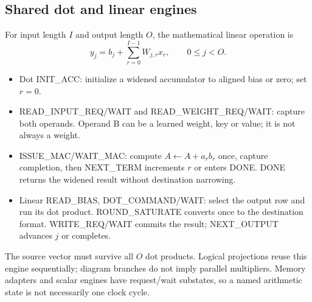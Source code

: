 \documentclass[11pt,a4paper]{article}
\begin{document}
\subsection{Shared dot and linear engines}
For input length $I$ and output length $O$, the mathematical linear operation is
\[
y_j=b_j+\sum_{r=0}^{I-1}W_{j,r}x_r,\qquad 0\leq j<O.
\]
\begin{itemize}
\item Dot INIT\_ACC: initialize a widened accumulator to aligned bias or zero; set $r=0$.
\item READ\_INPUT\_REQ/WAIT and READ\_WEIGHT\_REQ/WAIT: capture both operands. Operand B can be a learned weight, key or value; it is not always a weight.
\item ISSUE\_MAC/WAIT\_MAC: compute $A\leftarrow A+a_rb_r$ once, capture completion, then NEXT\_TERM increments $r$ or enters DONE. DONE returns the widened result without destination narrowing.
\item Linear READ\_BIAS, DOT\_COMMAND/WAIT: select the output row and run its dot product. ROUND\_SATURATE converts once to the destination format. WRITE\_REQ/WAIT commits the result; NEXT\_OUTPUT advances $j$ or completes.
\end{itemize}
The source vector must survive all $O$ dot products. Logical projections reuse this engine sequentially; diagram branches do not imply parallel multipliers. Memory adapters and scalar engines have request/wait substates, so a named arithmetic state is not necessarily one clock cycle.
\end{document}

